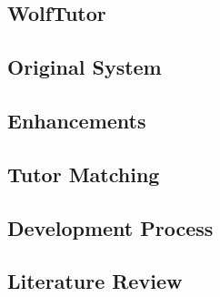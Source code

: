 \subsection{WolfTutor}
\label{sec:wolftutor}


\subsection{Original System}
\label{sec:original_system}


\subsection{Enhancements}
 

\subsection{Tutor Matching}
\label{sec:tutor-matching}


\subsection{Development Process}
\label{sec:development-process}



\subsection{Literature Review}
\label{sec:literature-review}







